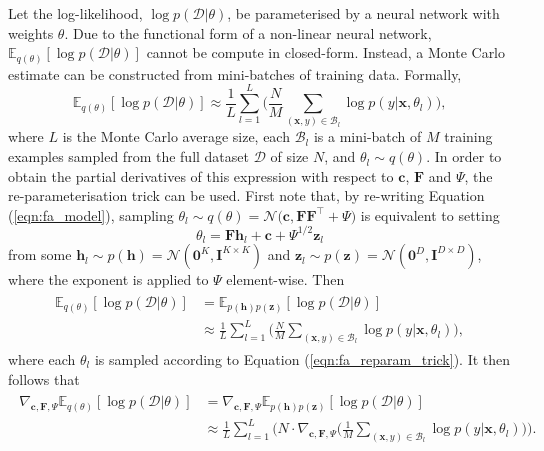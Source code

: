 \documentclass[msc,deptreport.inf]{infthesis} %
\newcommand{\matr}[1]{\mathbf{#1}}
\newcommand{\E}{\mathbb E}
\begin{document}
Let the log-likelihood, $\log p(\mathcal{D} | \theta)$, be parameterised by a neural network with weights $\theta$. Due to the functional form of a non-linear neural network, $\E_{q(\theta)} [\log p(\mathcal{D} | \theta)]$ cannot be compute in closed-form. Instead, a Monte Carlo estimate can be constructed from mini-batches of training data. Formally, 
\begin{equation}
	 \E_{q(\theta)} [\log p(\mathcal{D} | \theta)]
	\approx \frac{1}{L} \sum_{l=1}^{L} \Bigg( \frac{N}{M} \sum_{(\matr{x}, y) \in \mathcal{B}_l} \log p(y | \matr{x}, \theta_l) \Bigg),
\end{equation}
where $L$ is the Monte Carlo average size, each $\mathcal{B}_l$ is a mini-batch of $M$ training examples sampled from the full dataset $\mathcal{D}$ of size $N$, and $\theta_l \sim q(\theta)$. In order to obtain the partial derivatives of this expression with respect to $\matr{c}$, $\matr{F}$ and $\Psi$, the re-parameterisation trick \cite{goodfellow2016} can be used. First note that, by re-writing Equation (\ref{eqn:fa_model}), sampling $\theta_l \sim q(\theta) = \mathcal{N}\big(\matr{c}, \matr{FF}^{\intercal} + \Psi\big)$ is equivalent to setting  
\begin{equation}\label{eqn:fa_reparam_trick}
	\theta_l = \matr{F}\matr{h}_l + \matr{c} + \Psi^{1/2} \matr{z}_l
\end{equation}
from some $\matr{h}_l \sim p(\matr{h}) = \mathcal{N}(\matr{0}^K, \matr{I}^{K \times K})$ and $\matr{z}_l \sim p(\matr{z}) = \mathcal{N}(\matr{0}^D, \matr{I}^{D \times D})$, where the exponent is applied to $\Psi$ element-wise. Then
\begin{align}
\begin{split}
	\E_{q(\theta)} [\log p(\mathcal{D} | \theta)]
	& = \E_{p(\matr{h})p(\matr{z})} [\log p(\mathcal{D} | \theta)] \\
	& \approx \frac{1}{L} \sum_{l=1}^{L} \Bigg( \frac{N}{M} \sum_{(\matr{x}, y) \in \mathcal{B}_l} \log p(y | \matr{x}, \theta_l) \Bigg),
\end{split}
\end{align}
where each $\theta_l$ is sampled according to Equation (\ref{eqn:fa_reparam_trick}). It then follows that
\begin{align}
\begin{split}\label{eqn:expected_grad_log_likelihood}
	\nabla_{\matr{c}, \matr{F}, \Psi} \E_{q(\theta)} [\log p(\mathcal{D} | \theta)]
	& = \nabla_{\matr{c}, \matr{F}, \Psi} \E_{p(\matr{h})p(\matr{z})} [\log p(\mathcal{D} | \theta)] \\
	& \approx \frac{1}{L} \sum_{l=1}^{L} \Bigg(N \cdot \nabla_{\matr{c}, \matr{F}, \Psi} \Bigg( \frac{1}{M} \sum_{(\matr{x}, y) \in \mathcal{B}_l} \log p(y | \matr{x}, \theta_l) \Bigg) \Bigg).
\end{split}
\end{align}
\end{document}
